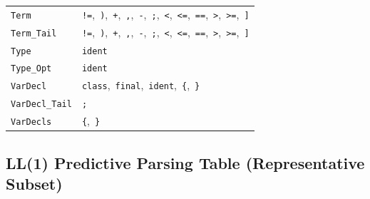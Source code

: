 \documentclass[11pt,a4paper]{article}
\begin{document}
\begin{center}
\begin{tabular}{|L{3.8cm}|L{10.6cm}|}
\texttt{Term} & \texttt{!=},\ \texttt{)},\ \texttt{+},\ \texttt{,},\ \texttt{-},\ \texttt{;},\ \texttt{<},\ \texttt{<=},\ \texttt{==},\ \texttt{>},\ \texttt{>=},\ \texttt{]} \\
\texttt{Term\_Tail} & \texttt{!=},\ \texttt{)},\ \texttt{+},\ \texttt{,},\ \texttt{-},\ \texttt{;},\ \texttt{<},\ \texttt{<=},\ \texttt{==},\ \texttt{>},\ \texttt{>=},\ \texttt{]} \\
\texttt{Type} & \texttt{ident} \\
\texttt{Type\_Opt} & \texttt{ident} \\
\texttt{VarDecl} & \texttt{class},\ \texttt{final},\ \texttt{ident},\ \texttt{\{},\ \texttt{\}} \\
\texttt{VarDecl\_Tail} & \texttt{;} \\
\texttt{VarDecls} & \texttt{\{},\ \texttt{\}} \\
\hline
\end{tabular}
\end{center}

\subsection{LL(1) Predictive Parsing Table (Representative Subset)}
\end{document}
